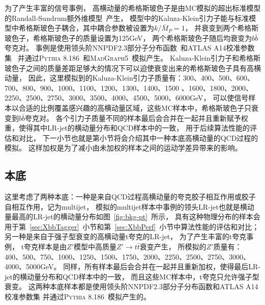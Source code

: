 为了产生丰富的信号事例，
高横动量的希格斯玻色子是由MC模拟的超出标准模型的Randall-Sundrum额外维模型~\cite{Randall:1999ee}产生，
模型中的Kaluza-Klein引力子能与标准模型中希格斯玻色子耦合，其中耦合参数被设置为$k/\bar{M}_P=1$，
并衰变到两个希格斯玻色子，希格斯玻色子的质量设置为125GeV，
两个希格斯玻色子随后均衰变为$b\bar{b}$夸克对。
事例是使用领头阶NNPDF2.3部分子分布函数~\cite{Martin:2009iq}和\textsc{ATLAS A14}校准参数集~\cite{ATL-PHYS-PUB-2014-021}
并通过\textsc{Pythia 8.186}~\cite{Sjostrand:2007gs}和\textsc{MadGraph5}~\cite{Alwall:2014hca}模拟产生。
Kaluza-Klein引力子和希格斯玻色子之间的质量差距足够大的情况下可以迫使衰变出来的希格斯玻色子具有高横动量，
因此，这里模拟到的Kaluza-Klein引力子质量有：300、400、500、600、700、800、900、1000、1100、1200、1300、1400、1500
、1600、1800、2000、2250、2500、2750、3000、3500、4000、4500、5000、6000GeV，
可以使信号样本以合适的比例覆盖感兴趣的高横动量区域，这些MC样本中，希格斯玻色子只衰变到$b\bar{b}$夸克对。
各个引力子质量不同的样本最后会合并在一起并且重新赋予权重，使得其中LR-jet的横动量分布和QCD样本中的一致，
用于后续算法性能的评估和对比，
下一小节也就是第小节将会介绍其中一种本底高横动量的QCD过程的模拟。
这样加权是为了减小由未加权的样本之间的运动学差异带来的影响。


\subsection{本底}
\label{sec:XbbSimB}

这里考虑了两种本底：一种是来自QCD过程高横动量的夸克胶子相互作用或胶子自相互作用，记为multijet，
模拟的multijet样本中事例的领头LR-jet也就是横动量最高的LR-jet的横动量分布如图~\ref{fig:bkg-pt}~所示，
具有这种物理分布的样本会用于第~\ref{sec:XbbTagger}~小节和第~\ref{sec:XbbPerf}~小节中算法性能的评估和对比；
另一种是来自于强子型衰变的高横动量t夸克的LR-jet，
为了产生丰富的t夸克事例，
t夸克样本是由$Z\prime$模型中高质量$Z' \to t\bar{t}$衰变产生，
所模拟的$Z\prime$质量有：
400、500、750、1000、1250、1500、1750、2000、2250、2500、2750、3000、4000、5000GeV。
同样，所有样本最后会合并在一起并且重新加权，使得最后LR-jet的横动量分布和QCD样本中的一致，
而且这些MC样本中，t夸克只允许强子型衰变。
这两种本底样本都是使用领头阶NNPDF2.3部分子分布函数和\textsc{ATLAS A14}校准参数集
并通过\textsc{Pythia 8.186}~\cite{Sjostrand:2007gs}模拟产生的。

